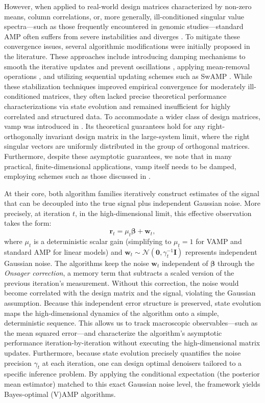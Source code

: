 However, when applied to real-world design matrices characterized by non-zero means, column correlations, or, more generally, ill-conditioned singular value spectra---such as those frequently encountered in genomic studies---standard AMP often suffers from severe instabilities and diverges \cite{vila_adaptive_2015,AMP_convergence}. To mitigate these convergence issues, several algorithmic modifications were initially proposed in the literature. These approaches include introducing damping mechanisms to smooth the iterative updates and prevent oscillations \cite{vila_adaptive_2015}, applying mean-removal operations \cite{vila_adaptive_2015}, and utilizing sequential updating schemes such as SwAMP \cite{SweptAMP2015}. While these stabilization techniques improved empirical convergence for moderately ill-conditioned matrices, they often lacked precise theoretical performance characterizations via state evolution and remained insufficient for highly correlated and structured data. To accommodate a wider class of design matrices, \gls{vamp} was introduced in \cite{rangan_vector_2019}. Its theoretical guarantees hold for any right-orthogonally invariant design matrix in the large-system limit, where the right singular vectors are uniformly distributed in the group of orthogonal matrices. Furthermore, despite these asymptotic guarantees, we note that in many practical, finite-dimensional applications, \gls{vamp} itself needs to be damped, employing schemes such as those discussed in \cite{VAMP_MRI}.

At their core, both algorithm families iteratively construct estimates of the signal that can be decoupled into the true signal plus independent Gaussian noise. More precisely, at iteration $t$, in the high-dimensional limit, this effective observation takes the form:
\begin{equation}
    \bm{r}_t = \mu_t \bm{\beta} + \bm{w}_t,
\end{equation}
where $\mu_t$ is a deterministic scalar gain (simplifying to $\mu_t = 1$ for VAMP and standard AMP for linear models) and $\bm{w}_t \sim \mathcal{N}(\mathbf{0}, \gamma_{t}^{-1} \bm{I})$ represents independent Gaussian noise. The algorithms keep the noise $\bm{w}_t$ independent of $\bm{\beta}$ through the \emph{Onsager correction}, a memory term that subtracts a scaled version of the previous iteration's measurement. Without this correction, the noise would become correlated with the design matrix and the signal, violating the Gaussian assumption. Because this independent error structure is preserved, state evolution maps the high-dimensional dynamics of the algorithm onto a simple, deterministic sequence. This allows us to track macroscopic observables—such as the mean squared error—and characterize the algorithm's asymptotic performance iteration-by-iteration without executing the high-dimensional matrix updates. Furthermore, because state evolution precisely quantifies the noise precision $\gamma_t$ at each iteration, one can design optimal denoisers tailored to a specific inference problem. By applying the conditional expectation (the posterior mean estimator) matched to this exact Gaussian noise level, the framework yields Bayes-optimal (V)AMP algorithms.

